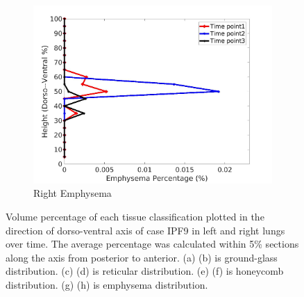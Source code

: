 \begin{figure}[H]
\begin{subfigure}{.42\linewidth}
  \includegraphics[width=\linewidth,trim={{.0\wd0} {.0\wd0} {.0\wd0} {.0\wd0}},clip]{Appendix/Image_AppexA/DorsoToVentral/IPF9RightLungEmphysemaDiseaseDorsoToVentral.jpg}
  \caption{Right Emphysema}
  \label{fig:IPF9DiseaseDorsoToVentral-h}
\end{subfigure}
\caption{Volume percentage of each tissue classification plotted in the direction of dorso-ventral axis of case IPF9 in left and right lungs over time. The average percentage was calculated within 5\% sections along the axis from posterior to anterior. (a) (b) is ground-glass distribution. (c) (d) is reticular distribution. (e) (f) is honeycomb distribution. (g) (h) is emphysema distribution.}
\label{fig:IPF9DiseaseDorsoToVentral}
\end{figure}

